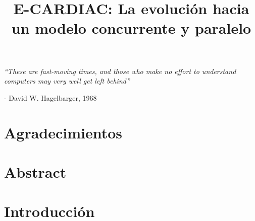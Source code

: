 \documentclass[letterpaper,12pt,oneside]{book}
\title{E-CARDIAC: La evolución hacia un modelo concurrente y paralelo}
\begin{document}
	\frontmatter
	\pagestyle{plain} %

    

\chapter*{}
\begin{flushright}%
  \emph{``These are fast-moving times, and those who make no effort to understand computers may very well get left behind''}
  
  
  - David W. Hagelbarger, 1968
\end{flushright}

\chapter*{Agradecimientos}

\chapter*{Abstract}

\chapter{Introducción}
\end{document}
